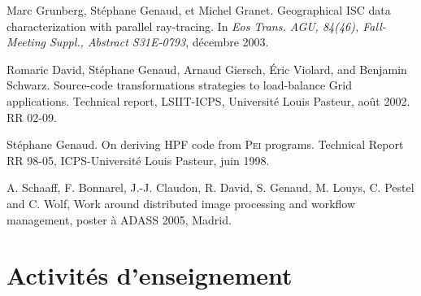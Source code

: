 \begin{thebibliography}{99}
Marc Grunberg, St\'{e}phane Genaud, et Michel Granet.
\newblock Geographical {ISC} data characterization with parallel ray-tracing.
\newblock In {\em Eos Trans. AGU, 84(46), Fall-Meeting Suppl., Abstract
  S31E-0793}, décembre 2003.

Romaric David, St\'{e}phane Genaud, Arnaud Giersch, \'{E}ric Violard, and
  Benjamin Schwarz.
\newblock Source-code transformations strategies to load-balance {G}rid
  applications.
\newblock Technical report, LSIIT-ICPS, Universit\'{e} Louis Pasteur, août
  2002.
\newblock RR 02-09.


St\'{e}phane Genaud.
\newblock On deriving {HPF} code from \textsc{Pei} programs.
\newblock Technical Report RR 98-05, ICPS-Universit\'{e} Louis Pasteur, juin
  1998.

A. Schaaff, F. Bonnarel, J.-J. Claudon, R. David, S. Genaud, M. Louys, C. Pestel and C. Wolf, 
\newblock Work around distributed image processing and workflow management, 
\newblock poster à ADASS 2005, Madrid.



\end{thebibliography}

\bigskip
{}


\section{Activités d'enseignement}

\label{sc:ensgnt-univ}

